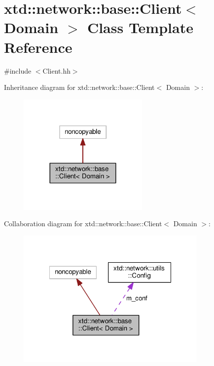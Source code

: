 \hypertarget{classxtd_1_1network_1_1base_1_1Client}{\section{xtd\-:\-:network\-:\-:base\-:\-:Client$<$ Domain $>$ Class Template Reference}
\label{classxtd_1_1network_1_1base_1_1Client}
}


{\ttfamily \#include $<$Client.\-hh$>$}



Inheritance diagram for xtd\-:\-:network\-:\-:base\-:\-:Client$<$ Domain $>$\-:
\nopagebreak
\begin{figure}[H]
\begin{center}
\leavevmode
\includegraphics[width=180pt]{classxtd_1_1network_1_1base_1_1Client__inherit__graph}
\end{center}
\end{figure}


Collaboration diagram for xtd\-:\-:network\-:\-:base\-:\-:Client$<$ Domain $>$\-:
\nopagebreak
\begin{figure}[H]
\begin{center}
\leavevmode
\includegraphics[width=263pt]{classxtd_1_1network_1_1base_1_1Client__coll__graph}
\end{center}
\end{figure}
